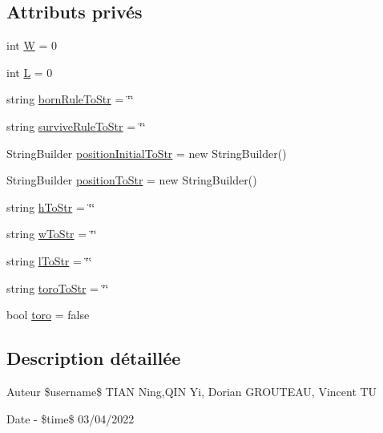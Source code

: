 \subsection*{Attributs privés}
\begin{DoxyCompactItemize}
\item 
int \mbox{\hyperlink{class_local_storage_a697e6c1b86b95f6f23dfb7affe69f89d}{W}} = 0
\item 
int \mbox{\hyperlink{class_local_storage_abc5df5f0502f1820786cd637af5cba1a}{L}} = 0
\item 
string \mbox{\hyperlink{class_local_storage_a1978c330f8e58a56238721a952521ab5}{born\+Rule\+To\+Str}} = \char`\"{}\char`\"{}
\item 
string \mbox{\hyperlink{class_local_storage_a30e862d386d3de7f8927b8eee65b18a3}{survive\+Rule\+To\+Str}} = \char`\"{}\char`\"{}
\item 
String\+Builder \mbox{\hyperlink{class_local_storage_ae6b81d22130b898273951e11294f9974}{position\+Initial\+To\+Str}} = new String\+Builder()
\item 
String\+Builder \mbox{\hyperlink{class_local_storage_a0645dca542f3021143c00278793b1420}{position\+To\+Str}} = new String\+Builder()
\item 
string \mbox{\hyperlink{class_local_storage_aa441df13c04a865a2b257bbb13bc66c7}{h\+To\+Str}} = \char`\"{}\char`\"{}
\item 
string \mbox{\hyperlink{class_local_storage_aebcebb4f53224e53eb3950faf69bbd61}{w\+To\+Str}} = \char`\"{}\char`\"{}
\item 
string \mbox{\hyperlink{class_local_storage_a5f6e41fc670d04aa4c3d73ab87ed8dd6}{l\+To\+Str}} = \char`\"{}\char`\"{}
\item 
string \mbox{\hyperlink{class_local_storage_a565ce6fbea192d9d10a2579b7efdb323}{toro\+To\+Str}} = \char`\"{}\char`\"{}
\item 
bool \mbox{\hyperlink{class_local_storage_a1feec4c648ee8f58201078f146677b63}{toro}} = false
\end{DoxyCompactItemize}


\subsection{Description détaillée}
\begin{DoxyAuthor}{Auteur}
\$username\$ T\+I\+AN Ning,Q\+IN Yi, Dorian G\+R\+O\+U\+T\+E\+AU, Vincent TU 
\end{DoxyAuthor}
\begin{DoxyDate}{Date}
-\/ \$time\$ 03/04/2022 
\end{DoxyDate}


